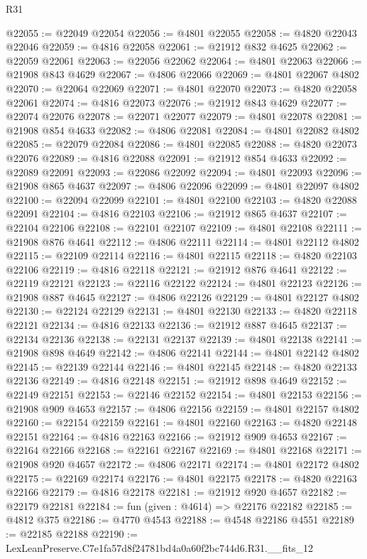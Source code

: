 \begin{lexlean}{R31}
\begin{coremodule}
@22055 := @22049 @22054
@22056 := @4801 @22055
@22058 := @4820 @22043 @22046
@22059 := @4816 @22058
@22061 := @21912 @832 @4625
@22062 := @22059 @22061
@22063 := @22056 @22062
@22064 := @4801 @22063
@22066 := @21908 @843 @4629
@22067 := @4806 @22066
@22069 := @4801 @22067 @4802
@22070 := @22064 @22069
@22071 := @4801 @22070
@22073 := @4820 @22058 @22061
@22074 := @4816 @22073
@22076 := @21912 @843 @4629
@22077 := @22074 @22076
@22078 := @22071 @22077
@22079 := @4801 @22078
@22081 := @21908 @854 @4633
@22082 := @4806 @22081
@22084 := @4801 @22082 @4802
@22085 := @22079 @22084
@22086 := @4801 @22085
@22088 := @4820 @22073 @22076
@22089 := @4816 @22088
@22091 := @21912 @854 @4633
@22092 := @22089 @22091
@22093 := @22086 @22092
@22094 := @4801 @22093
@22096 := @21908 @865 @4637
@22097 := @4806 @22096
@22099 := @4801 @22097 @4802
@22100 := @22094 @22099
@22101 := @4801 @22100
@22103 := @4820 @22088 @22091
@22104 := @4816 @22103
@22106 := @21912 @865 @4637
@22107 := @22104 @22106
@22108 := @22101 @22107
@22109 := @4801 @22108
@22111 := @21908 @876 @4641
@22112 := @4806 @22111
@22114 := @4801 @22112 @4802
@22115 := @22109 @22114
@22116 := @4801 @22115
@22118 := @4820 @22103 @22106
@22119 := @4816 @22118
@22121 := @21912 @876 @4641
@22122 := @22119 @22121
@22123 := @22116 @22122
@22124 := @4801 @22123
@22126 := @21908 @887 @4645
@22127 := @4806 @22126
@22129 := @4801 @22127 @4802
@22130 := @22124 @22129
@22131 := @4801 @22130
@22133 := @4820 @22118 @22121
@22134 := @4816 @22133
@22136 := @21912 @887 @4645
@22137 := @22134 @22136
@22138 := @22131 @22137
@22139 := @4801 @22138
@22141 := @21908 @898 @4649
@22142 := @4806 @22141
@22144 := @4801 @22142 @4802
@22145 := @22139 @22144
@22146 := @4801 @22145
@22148 := @4820 @22133 @22136
@22149 := @4816 @22148
@22151 := @21912 @898 @4649
@22152 := @22149 @22151
@22153 := @22146 @22152
@22154 := @4801 @22153
@22156 := @21908 @909 @4653
@22157 := @4806 @22156
@22159 := @4801 @22157 @4802
@22160 := @22154 @22159
@22161 := @4801 @22160
@22163 := @4820 @22148 @22151
@22164 := @4816 @22163
@22166 := @21912 @909 @4653
@22167 := @22164 @22166
@22168 := @22161 @22167
@22169 := @4801 @22168
@22171 := @21908 @920 @4657
@22172 := @4806 @22171
@22174 := @4801 @22172 @4802
@22175 := @22169 @22174
@22176 := @4801 @22175
@22178 := @4820 @22163 @22166
@22179 := @4816 @22178
@22181 := @21912 @920 @4657
@22182 := @22179 @22181
@22184 := fun (given : @4614) => @22176 @22182
@22185 := @4812 @375
@22186 := @4770 @4543
@22188 := @4548 @22186 @4551
@22189 := @22185 @22188
@22190 := LexLeanPreserve.C7e1fa57d8f24781bd4a0a60f2bc744d6.R31.__fits_12

\end{coremodule}
\end{lexlean}

